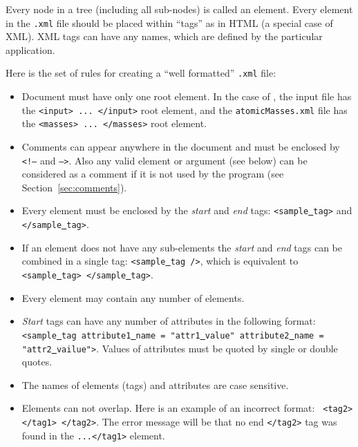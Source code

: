 \documentclass[11pt]{article}
\begin{document}
Every node in a tree (including all sub-nodes) is called an element. 
Every element in the {\tt .xml} file should be placed within ``tags'' as in HTML (a special case of XML). 
XML tags can have any names, which are defined by the particular application.

Here is the set of rules for creating a ``well formatted'' {\tt .xml} file:
\begin{itemize}

\item Document must have only one root element. 
In the case of \ezFCF, the input file has the {\tt <input> ... </input>} root element, 
and the {\tt atomicMasses.xml} file has the {\tt <masses> ... </masses>} root element.

\item Comments can appear anywhere in the document and must be enclosed by {\tt <!--} and {\tt -->}. 
Also any valid element or argument (see below) can be considered as a comment if it is not used by the program
(see Section~\ref{sec:comments}).

\item Every element must be enclosed by the {\em start} and {\em end} tags: 
{\tt <sample\underline{~}tag>} and {\tt </sample\underline{~}tag>}.

\item If an element does not have any sub-elements the {\em start} and {\em end} tags can be combined in a single tag: 
{\tt <sample\underline{~}tag />}, which is equivalent to {\tt <sample\underline{~}tag>  </sample\underline{~}tag>}.

\item Every element may contain any number of elements.

\item {\em Start} tags can have any number of attributes in the following format: 
{\tt <sample\underline{~}tag attribute1\underline{~}name = "attr1\underline{~}value" attribute2\underline{~}name = "attr2\underline{~}vailue">}. 
Values of attributes must be quoted by single or double quotes.

\item The names of elements (tags) and attributes are case sensitive.

\item Elements can not overlap. 
Here is an example of an incorrect format: {\tt <tag1> <tag2> </tag1> </tag2>}. 
The error message will be that no end {\tt </tag2>} tag was found in the {\tt <tag1>...</tag1>} element.

\end{itemize}
\end{document}
